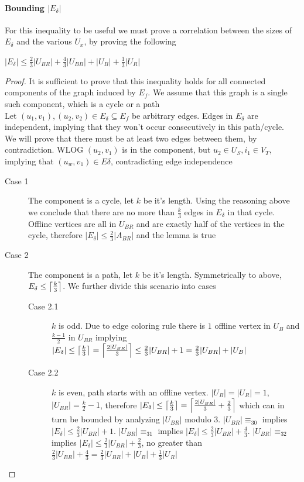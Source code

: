 \paragraph{Bounding $|E_\delta|$}
For this inequality to be useful we must prove a correlation between the sizes of $E_\delta$ and the various $U_x$, by proving the following
\begin{lemma}
	\label{sa-lm}
	$|E_\delta|\leq\frac{2}{3}|U_{BR}|+\frac{4}{3}|U_{BB}|+|U_B|+\frac{1}{3}|U_R|$
\end{lemma}
\begin{proof}
	It is sufficient to prove that this inequality holds for all connected components of the graph induced by $E_f$. We assume that this graph is a single such component, which is a cycle or a path\\
	Let $(u_1,v_1),(u_2,v_2)\in E_\delta\subseteq E_f$ be arbitrary edges. Edges in $E_\delta$ are independent, implying that they won't occur consecutively in this path/cycle.\\
	We will prove that there must be at least two edges between them, by contradiction. WLOG $(u_2,v_1)$ is in the component, but $u_2\in U_S,i_1\in V_T$, implying that $(u_w,v_1)\in E\delta$, contradicting edge independence\\
	\begin{description}
		\item[Case 1] The component is a cycle, let $k$ be it's length. Using the reasoning above we conclude that there are no more than $\frac{k}{3}$ edges in $E_\delta$ in that cycle. Offline vertices are all in $U_{BR}$ and are exactly half of the vertices in the cycle, therefore $|E_\delta|\leq\frac{2}{3}|A_{BR}|$ and the lemma is true
		\item[Case 2] The component is a path, let $k$ be it's length. Symmetrically to above, $E_\delta\leq\left\lceil \frac{k}{3} \right\rceil$. We further divide this scenario into cases
		\begin{description}
			\item[Case 2.1] $k$ is odd. Due to edge coloring rule there is $1$ offline vertex in $U_B$ and $\frac{k-1}{2}$ in $U_{BR}$ implying $|E_\delta|\leq\left\lceil \frac{k}{3} \right\rceil=\left\lceil \frac{2|U_{BR}|}{3} \right\rceil\leq\frac{2}{3}|U_{BR}|+1\allowbreak=\frac{2}{3}|U_{BR}|+|U_B|$
			\item[Case 2.2] $k$ is even, path starts with an offline vertex. $|U_B|=|U_R|=1$,\\$|U_{BR}|=\frac{k}{2}-1$, therefore $|E_\delta|\leq\left\lceil \frac{k}{3} \right\rceil=\left\lceil \frac{2|U_{BR}|}{3}+\frac{2}{3} \right\rceil$ which can in turn be bounded by analyzing $|U_{BR}|$ modulo $3$. $|U_{BR}|\equiv_30$ implies $|E_\delta|\leq\frac{2}{3}|U_{BR}|+1$. $|U_{BR}|\equiv_31$ implies $|E_\delta|\leq\frac{2}{3}|U_{BR}|+\frac{4}{3}$. $|U_{BR}|\equiv_32$ implies $|E_\delta|\leq \frac{2}{3}|U_{BR}|+\frac{2}{3}$, no greater than $\frac{2}{3}|U_{BR}|+\frac{4}{3}=\allowbreak\frac{2}{3}|U_{BR}|+|U_B|+\frac{1}{3}|U_R|$

\end{description}
\end{description}
\end{proof}
